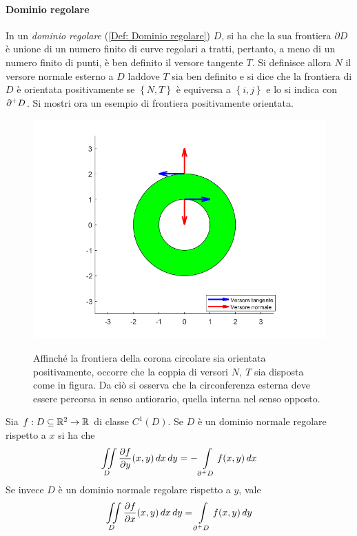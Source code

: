  \paragraph{Dominio regolare}
 In un \textit{dominio regolare} (\ref{Def: Dominio regolare}) $D$, si ha che la sua frontiera $\partial D$ è unione di un numero finito di curve regolari a tratti, pertanto, a meno di un numero finito di punti, è ben definito il versore tangente $T$. Si definisce allora $N$ il versore normale esterno a $D$ laddove $T$ sia ben definito e si dice che la frontiera di $D$ è orientata positivamente se $\left\{N,T\right\}$ è equiversa a $\left\{i, j\right\}$ e lo si indica con $\partial^+ D$.
 Si mostri ora un esempio di frontiera positivamente orientata.
 \begin{figure}[H]
     \centering
     \begin{minipage}{0.5\textwidth}
     \includegraphics[width=\textwidth]{Capitoli/Capitolo5/Bordo orientato.png}
     \end{minipage}
     \begin{minipage}{0.4\textwidth}
         Affinché la frontiera della corona circolare sia orientata positivamente, occorre che la coppia di versori $N,\ T$ sia disposta come in figura. Da ciò si osserva che la circonferenza esterna deve essere percorsa in senso antiorario, quella interna nel senso opposto.
     \end{minipage}
 \end{figure}
 \begin{theorem} \label{Teo: Formule di Gauss Green}
 Sia $f: D\subseteq \mathbb{R}^2 \to \mathbb{R}$ di classe $C^1(D)$. Se $D$ è un dominio normale regolare rispetto a $x$ si ha che
 \begin{equation} \label{Eq: Gauss-Green per dimostrazione}
     \iint\limits_D{\frac{\partial f}{\partial y}(x,y)}\,dx\,dy= -\int\limits_{\partial^+ D}{f(x,y)}\,dx
 \end{equation}
     Se invece $D$ è un dominio normale regolare rispetto a $y$, vale
     \begin{equation}
    \iint\limits_D{\frac{\partial f}{\partial x}(x,y)}\,dx\,dy= \int\limits_{\partial^+ D}{f(x,y)}\,dy
     \end{equation}
 \end{theorem}
